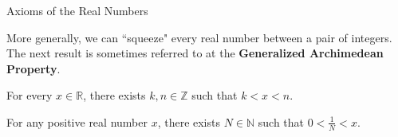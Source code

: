 \begin{section}{Axioms of the Real Numbers}
%
%
%
%
%  

More generally, we can ``squeeze" every real number between a pair of integers. The next result is sometimes referred to at the \textbf{Generalized Archimedean Property}.

\begin{theorem}
For every $x\in\mathbb{R}$, there exists $k,n\in\mathbb{Z}$ such that $k<x<n$.
\end{theorem}

\begin{theorem}\label{thm:small reciprocal}
For any positive real number $x$, there exists $N\in \mathbb{N}$ such that $0<\frac{1}{N}<x$.
\end{theorem}


\end{section}
